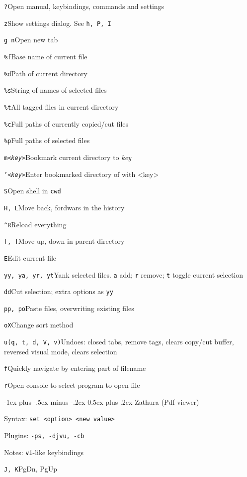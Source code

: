 \documentclass[12pt,landscape]{article}
\makeatletter
\renewcommand{\section}{\@startsection{section}{1}{0mm}%
                                {-1ex plus -.5ex minus -.2ex}%
                                {0.5ex plus .2ex}%
                                {\normalfont\large\bfseries}}
\def\cm#1#2{{\tt#1}\dotfill#2\par}
\makeatother
\begin{document}
\begin{multicols}{3}
\cm{?}{Open manual, keybindings, commands and settings}

\cm{z}{Show settings dialog. See \texttt{h, P, I}}

\cm{g n}{Open new tab}

\cm{\%f}{Base name of current file}

\cm{\%d}{Path of current directory}

\cm{\%s}{String of names of selected files}

\cm{\%t}{All tagged files in current directory}

\cm{\%c}{Full paths of currently copied/cut files}

\cm{\%p}{Full paths of selected files}

\cm{m\textit{<key>}}{Bookmark current directory to \textit{key}}

\cm{'\textit{<key>}}{Enter bookmarked directory of with <key>}

\cm{S}{Open shell in \texttt{cwd}}

\cm{H, L}{Move back, fordwars in the history}

\cm{\textasciicircum R}{Reload everything}

\cm{[, ]}{Move up, down in parent directory}

\cm{E}{Edit current file}

\cm{yy, ya, yr, yt}{Yank selected files. \texttt{a} add; \texttt{r} remove; \texttt{t} toggle current selection}

\cm{dd}{Cut selection; extra options as \texttt{yy}}

\cm{pp, po}{Paste files, overwriting existing files}

\cm{oX}{Change sort method}

\cm{u(q, t, d, V, v)}{Undoes: closed tabs, remove tags, clears copy/cut buffer, reversed visual mode, clears selection}

\cm{f}{Quickly navigate by entering part of filename}

\cm{r}{Open console to select program to open file}

\section{Zathura (Pdf viewer)}

Syntax: \texttt{set <option> <new value>}

Plugins: \texttt{-ps, -djvu, -cb}

Notes: \texttt{vi}-like keybindings

\cm{J, K}{PgDn, PgUp}


\end{multicols}
\end{document}
